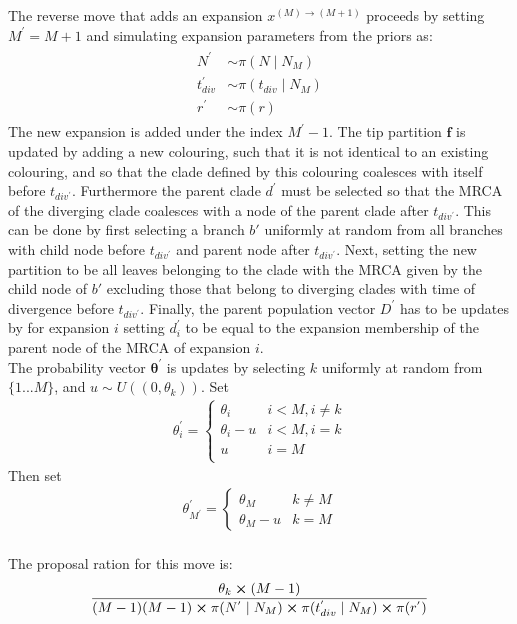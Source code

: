 \documentclass{report}
\theoremstyle{definition}
\begin{document}
The reverse move that adds an expansion $x^{(M)\to(M+1)}$ 
proceeds by setting $M^{'} = M+1$ and simulating expansion parameters from the priors as:
\begin{gather}
\begin{aligned}
N^{'} &\sim \pi(N\mid N_{M})\\
t^{'}_{div} &\sim \pi(t_{div}\mid N_{M})\\
r^{'} &\sim \pi(r)
\end{aligned}
\end{gather}
The new expansion is added under the index $M^{'}-1$. The tip partition $\mathbf{f}$ is updated by adding a new colouring, such that it is not identical to an existing colouring, and so that the clade defined by this colouring coalesces with itself before $t_{div^{'}}$. Furthermore the parent clade $d^{'}$ must be selected so that the MRCA of the diverging clade coalesces with a node of the parent clade after $t_{div^{'}}$. This can be done by first selecting a branch $b'$ uniformly at random from all branches with child node before $t_{div^{'}}$ and parent node after $t_{div^{'}}$. Next, setting the new partition to be all leaves belonging to the clade with the MRCA given by the child node of $b'$ excluding those that belong to diverging clades with time of divergence before $t_{div^{'}}$. Finally, the parent population vector $D^{'}$ has to be updates by for expansion $i$ setting $d_i^{'}$ to be equal to the expansion membership of the parent node of the MRCA of expansion $i$.\\
The probability vector $\pmb\theta^{'}$ is updates by selecting $k$ uniformly at random from $\{1...M\}$, and $u\sim U((0, \theta_k))$. Set 
\begin{gather}
  \theta^{'}_i = 
  \begin{cases} 
      \theta_i & i < M, i \neq k \\
      \theta_i-u& i < M, i = k \\
      u & i = M\\
  \end{cases}
\end{gather}
Then set 
\begin{gather}
  \theta^{'}_{M^{'}} = 
  \begin{cases} 
      \theta_M & k \neq M \\
      \theta_M-u& k=M
  \end{cases}
\end{gather}\\
The proposal ration for this move is:
\begin{gather}
\frac{\theta_k\cross(M-1)}{(M-1)(M-1)\cross\pi(N^{'}\mid N_{M})\cross\pi(t^{'}_{div}\mid N_{M})\cross\pi(r^{'})}
\end{gather}
\end{document}
